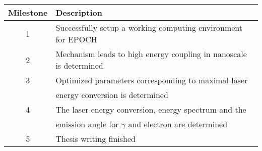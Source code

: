 \documentclass[]{article}
\begin{document}
\begin{table}[]
\centering
\begin{tabular}{|c|l|}
\hline
Milestone & Description \\ \hline
1         & Successfully setup a working computing environment for EPOCH            \\ \hline
2         & Mechanism leads to high energy coupling in nanoscale is determined           \\ \hline
3         & Optimized parameters corresponding to maximal laser \\
          & energy conversion is determined            \\ \hline
4         &  The laser energy conversion,  energy spectrum and the           \\
          &  emission angle for $\gamma$ and electron are determined \\ \hline
5         &  Thesis writing finished           \\ \hline
\end{tabular}
\end{table}
\end{document}
